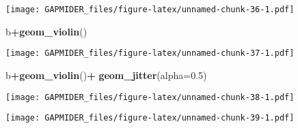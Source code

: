 \documentclass[]{article}
\newenvironment{Shaded}{\begin{snugshade}}{\end{snugshade}}
\newcommand{\DataTypeTok}[1]{\textcolor[rgb]{0.13,0.29,0.53}{#1}}
\newcommand{\FloatTok}[1]{\textcolor[rgb]{0.00,0.00,0.81}{#1}}
\newcommand{\KeywordTok}[1]{\textcolor[rgb]{0.13,0.29,0.53}{\textbf{#1}}}
\newcommand{\NormalTok}[1]{#1}
\newcommand{\OperatorTok}[1]{\textcolor[rgb]{0.81,0.36,0.00}{\textbf{#1}}}
\newcommand{\StringTok}[1]{\textcolor[rgb]{0.31,0.60,0.02}{#1}}
\begin{document}
\texttt{[image: GAPMIDER\_files/figure-latex/unnamed-chunk-36-1.pdf]}

\begin{Shaded}
\begin{Highlighting}[]
\NormalTok{b}\OperatorTok{+}\KeywordTok{geom_violin}\NormalTok{()}
\end{Highlighting}
\end{Shaded}

\texttt{[image: GAPMIDER\_files/figure-latex/unnamed-chunk-37-1.pdf]}

\begin{Shaded}
\begin{Highlighting}[]
\NormalTok{b}\OperatorTok{+}\KeywordTok{geom_violin}\NormalTok{()}\OperatorTok{+}
\StringTok{  }\KeywordTok{geom_jitter}\NormalTok{(}\DataTypeTok{alpha=}\FloatTok{0.5}\NormalTok{)}
\end{Highlighting}
\end{Shaded}

\texttt{[image: GAPMIDER\_files/figure-latex/unnamed-chunk-38-1.pdf]}

\begin{Shaded}
\end{Shaded}

\texttt{[image: GAPMIDER\_files/figure-latex/unnamed-chunk-39-1.pdf]}
\end{document}
